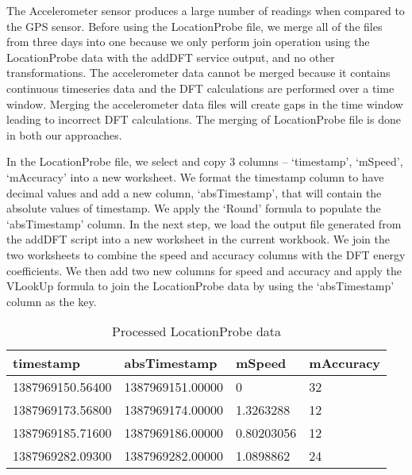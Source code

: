 The Accelerometer sensor produces a large number of readings when compared to the GPS sensor. Before using the LocationProbe file, we merge all of the files from three days into one because we only perform join operation using the LocationProbe data with the addDFT service output, and no other transformations. The accelerometer data cannot be merged because it contains continuous timeseries data and the DFT calculations are performed over a time window. Merging the accelerometer data files will create gaps in the time window leading to incorrect DFT calculations. The merging of LocationProbe file is done in both our approaches. 


In the LocationProbe file, we select and copy 3 columns – `timestamp', `mSpeed', `mAccuracy' into a new worksheet. We format the timestamp column to have decimal values and add a new column, `absTimestamp', that will contain the absolute values of timestamp. We apply the `Round' formula to populate the `absTimestamp' column. In the next step, we load the output file generated from the addDFT script into a new worksheet in the current workbook. We join the two worksheets to combine the speed and accuracy columns with the DFT energy coefficients. We then add two new columns for speed and accuracy and apply the VLookUp formula to join the LocationProbe data by using the `absTimestamp' column as the key.

\begin{table}[h]
	\centering	
	\caption{Processed LocationProbe data \label{tab:processed_location_data}}
  	\begin{tabular}{ | p{2cm} | p{2cm} | p{1cm} | p{1.5cm} | }
    	\hline
	    \textbf{timestamp} & \textbf{absTimestamp} & \textbf{mSpeed} & \textbf{mAccuracy} \\ \hline
	    1387969150.56400 & 1387969151.00000 & 0 & 32 \\ \hline
 		1387969173.56800 & 1387969174.00000 & 1.3263288 & 12 \\ \hline
 		1387969185.71600 & 1387969186.00000 & 0.80203056 & 12 \\ \hline
 		1387969282.09300 & 1387969282.00000 & 1.0898862 & 24 \\
	    \hline
  	\end{tabular}
\end{table}


